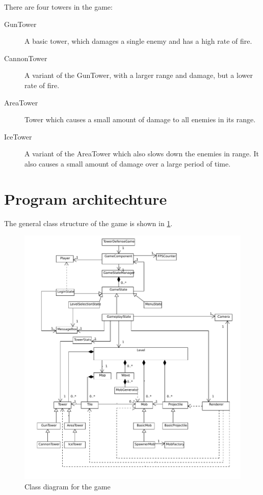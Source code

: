 \documentclass[11pt]{article}
\begin{document}
There are four towers in the game:
\begin{description}
\item[GunTower] A basic tower, which damages a single enemy and has a high rate of fire.
\item[CannonTower] A variant of the GunTower, with a larger range and
  damage, but a lower rate of fire.
\item[AreaTower] Tower which causes a small amount of damage to all
  enemies in its range.
\item[IceTower] A variant of the AreaTower which also slows down the
  enemies in range. It also causes a small amount of damage over a
  large period of time.

\end{description}

%  
%  

\section{Program architechture}
\label{sec-2}

The general class structure of the game is shown in \ref{fig:class}.

\begin{figure}
\includegraphics[width=\textwidth]{classdiagram.pdf}
\caption{Class diagram for the game}
\label{fig:class}
\end{figure}
\end{document}
